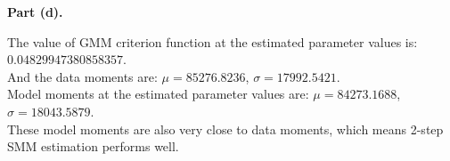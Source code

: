 \documentclass[letterpaper,12pt]{article}
\theoremstyle{definition}
\begin{document}
\noindent\textbf{Part (d).}
\begin{figure}[htb]\centering\captionsetup{width=4.0in}
  \label{Fig1d}
\end{figure}

The value of GMM criterion function at the estimated parameter values is: \\
$0.04829947380858357$.\\
And the data moments are: $\mu = 85276.8236$, $\sigma = 17992.5421$.\\
Model moments at the estimated parameter values are: $\mu = 84273.1688$, $\sigma = 18043.5879$.\\
These model moments are also very close to data moments, which means 2-step SMM estimation performs well.\\
\end{document}
